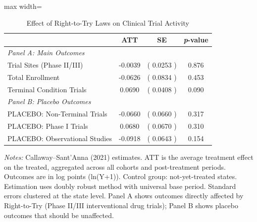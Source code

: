 \begin{table}[htbp]
\centering
\caption{Effect of Right-to-Try Laws on Clinical Trial Activity}
\label{tab:main}
\begin{adjustbox}{max width=\textwidth}
\begin{tabular}{lccc}
\hline\hline
 & ATT & SE & \textit{p}-value \\
\hline
\multicolumn{4}{l}{\textit{Panel A: Main Outcomes}} \\
Trial Sites (Phase II/III)  &  -0.0039  & ( 0.0253 ) &  0.876  \\
Total Enrollment  &  -0.0626  & ( 0.0834 ) &  0.453  \\
Terminal Condition Trials  &  0.0690  & ( 0.0408 ) &  0.090  \\
\hline
\multicolumn{4}{l}{\textit{Panel B: Placebo Outcomes}} \\
PLACEBO: Non-Terminal Trials  &  -0.0660  & ( 0.0660 ) &  0.317  \\
PLACEBO: Phase I Trials  &  0.0680  & ( 0.0670 ) &  0.310  \\
PLACEBO: Observational Studies  &  -0.0918  & ( 0.0643 ) &  0.154  \\
\hline\hline
\end{tabular}
\end{adjustbox}
\begin{minipage}{0.95\textwidth}
\footnotesize \textit{Notes:} Callaway--Sant'Anna (2021) estimates. ATT is the average treatment effect on the treated, aggregated across all cohorts and post-treatment periods. Outcomes are in log points (ln(Y+1)). Control group: not-yet-treated states. Estimation uses doubly robust method with universal base period. Standard errors clustered at the state level. Panel A shows outcomes directly affected by Right-to-Try (Phase II/III interventional drug trials); Panel B shows placebo outcomes that should be unaffected.
\end{minipage}
\end{table}

